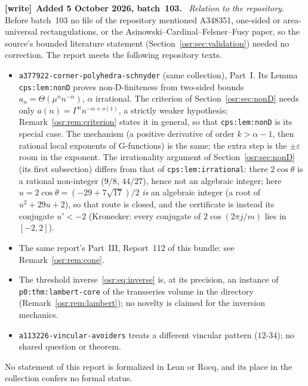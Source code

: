 \documentclass[11pt,letterpaper]{article}
\newcommand{\G}{\Gamma}\newcommand{\s}{\sqrt{17}}
\numberwithin{equation}{section}
\newenvironment{writenote}[1][]{\par\smallskip\begingroup\small
 \noindent\textbf{[write]}\if\relax\detokenize{#1}\relax\else~\textbf{#1.}\fi\ }%
 {\par\endgroup\smallskip}
\begin{document}
\begin{writenote}[Added 5 October 2026, batch~103]
\emph{Relation to the repository.} Before batch~103 no file of the
repository mentioned A348351, one-sided or area-universal rectangulations, or
the Asinowski--Cardinal--Felsner--Fusy paper, so the source's bounded
literature statement (Section~\ref{osr:sec:validation}) needed no correction.
The report meets the following repository texts.
\begin{itemize}
\item \nolinkurl{a377922-corner-polyhedra-schnyder} (same collection), Part~I.
 Its Lemma \nolinkurl{cps:lem:nonD} proves non-D-finiteness from two-sided
 bounds $a_n=\Theta(\mu^nn^{-\alpha})$, $\alpha$ irrational. The criterion
 of Section~\ref{osr:sec:nonD} needs only $a(n)=\G^nn^{-\alpha+o(1)}$, a
 strictly weaker hypothesis; Remark~\ref{osr:rem:criterion} states it in
 general, so that \nolinkurl{cps:lem:nonD} is its special case. The mechanism
 (a positive derivative of order $k>\alpha-1$, then rational local exponents
 of G-functions) is the same; the extra step is the $\pm\varepsilon$ room in
 the exponent. The irrationality argument of
 Section~\ref{osr:sec:nonD} (its first subsection) differs from that of
 \nolinkurl{cps:lem:irrational}: there $2\cos\theta$ is a rational
 non-integer ($9/8$, $44/27$), hence not an algebraic integer; here
 $u=2\cos\theta=(-29+7\s)/2$ \emph{is} an algebraic integer (a root of
 $u^2+29u+2$), so that route is closed, and the certificate is instead its
 conjugate $u'<-2$ (Kronecker: every conjugate of $2\cos(2\pi j/m)$ lies in
 $[-2,2]$).
\item The same report's Part~III, Report~112 of this bundle: see
 Remark~\ref{osr:rem:cone}.
\item The threshold inverse~\eqref{osr:eq:inverse} is, at its precision, an
 instance of \nolinkurl{p0:thm:lambert-core} of the transseries volume
  in the directory
 (Remark~\ref{osr:rem:lambert}); no novelty is claimed for the inversion
 mechanics.
\item \nolinkurl{a113226-vincular-avoiders} treats a different vincular
 pattern ($12$-$34$); no shared question or theorem.
\end{itemize}
No statement of this report is formalized in Lean or Rocq, and its place in
the collection confers no formal status.
\end{writenote}
\end{document}
